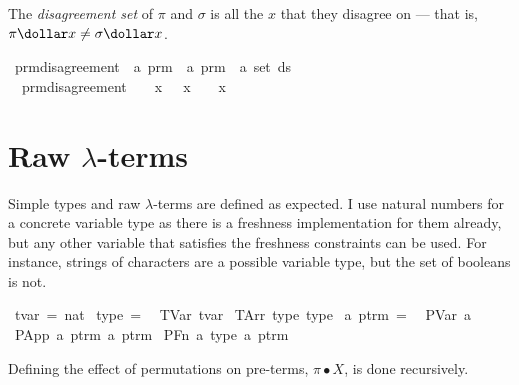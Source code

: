 \begin{definition}
The \emph{disagreement set} of \(\pi\) and \(\sigma\) is all the \(x\) that they disagree on --- that is, \(\pi \dollar x \neq \sigma \dollar x\).
\end{definition}
\begin{implementation}
\isamarkupfalse%
\ prm{\isacharunderscore}disagreement\ {\isacharcolon}{\isacharcolon}\ {\isachardoublequoteopen}{\isacharprime}a\ prm\ {\isasymRightarrow}\ {\isacharprime}a\ prm\ {\isasymRightarrow}\ {\isacharprime}a\ set{\isachardoublequoteclose}\ {\isacharparenleft}{\isachardoublequoteopen}ds{\isachardoublequoteclose}{\isacharparenright}\ \isanewline
\ \ {\isachardoublequoteopen}prm{\isacharunderscore}disagreement\ {\isasympi}\ {\isasymsigma}\ {\isasymequiv}\ {\isacharbraceleft}x{\isachardot}\ {\isasympi}\ {\isachardollar}\ x\ {\isasymnoteq}\ {\isasymsigma}\ {\isachardollar}\ x{\isacharbraceright}{\isachardoublequoteclose}\isanewline
\end{implementation}

\section{Raw \(\lambda\)-terms}
Simple types and raw \(\lambda\)-terms are defined as expected.
I use natural numbers for a concrete variable type as there is a freshness implementation for them already, but any other variable that satisfies the freshness constraints can be used.
For instance, strings of characters are a possible variable type, but the set of booleans is not.

\begin{implementation}
\isamarkupfalse%
\ tvar\ =\ nat\isanewline
\isanewline
{}\isamarkupfalse%
\ type\ =\isanewline
\ \ TVar\ tvar\isanewline
{\isacharbar}\ TArr\ type\ type\isanewline
\isanewline
{}\isamarkupfalse%
\ {\isacharprime}a\ ptrm\ =\isanewline
\ \ PVar\ {\isacharprime}a\isanewline
{\isacharbar}\ PApp\ {\isachardoublequoteopen}{\isacharprime}a\ ptrm{\isachardoublequoteclose}\ {\isachardoublequoteopen}{\isacharprime}a\ ptrm{\isachardoublequoteclose}\isanewline
{\isacharbar}\ PFn\ {\isacharprime}a\ type\ {\isachardoublequoteopen}{\isacharprime}a\ ptrm{\isachardoublequoteclose}\isanewline
\end{implementation}

Defining the effect of permutations on pre-terms, \(\pi \bullet X\), is done recursively.

